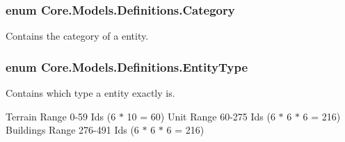 \subsubsection[{Category}]{\setlength{\rightskip}{0pt plus 5cm}enum {\bf Core.\+Models.\+Definitions.\+Category}\hspace{0.3cm}{\ttfamily [strong]}}\label{namespaceCore_1_1Models_1_1Definitions_a8be0403c3e883fe583d7bb3893c22c65}


Contains the category of a entity. 

\hypertarget{namespaceCore_1_1Models_1_1Definitions_a609ed13db028308ebc6c5fbd98615fdc}{}
\subsubsection[{Entity\+Type}]{\setlength{\rightskip}{0pt plus 5cm}enum {\bf Core.\+Models.\+Definitions.\+Entity\+Type}\hspace{0.3cm}{\ttfamily [strong]}}\label{namespaceCore_1_1Models_1_1Definitions_a609ed13db028308ebc6c5fbd98615fdc}


Contains which type a entity exactly is. 

Terrain Range 0-\/59 Id\textquotesingle{}s (6 $\ast$ 10 = 60) Unit Range 60-\/275 Id\textquotesingle{}s (6 $\ast$ 6 $\ast$ 6 = 216) Buildings Range 276-\/491 Id\textquotesingle{}s (6 $\ast$ 6 $\ast$ 6 = 216) 